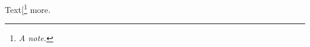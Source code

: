 \documentclass{article}
\makeatletter
\let\old@fn\footnote
\def\footnote{\@ifnextchar[\fn@opt\fn@noopt}
\def\fn@opt[#1]#2{\old@fn[#1]{#2}}
\def\fn@noopt#1{\old@fn{\textit{#1}}}
\makeatother
\begin{document}
Text\footnote{A note.} more.
\end{document}
